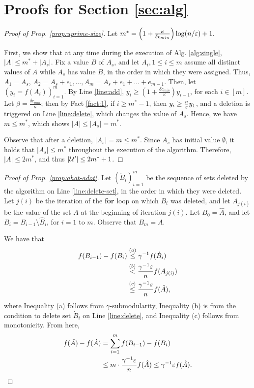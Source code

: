 \onecolumn

\appendix




\section{Proofs for Section \ref{sec:alg}} \label{apx:proof}
\begin{proof}[Proof of Prop. \ref{prop:uprime-size}]
  Let $m^* = \left( 1 + \frac{\kappa }{\delta c_{min} } \right) \log ( n / \varepsilon ) + 1.$
  
  First, we show that at any time during the execution of Alg. \ref{alg:single}, $|A| \le m^* + |A_s|$.
  Fix a value $B$ of $A_s$, and let $A_i, 1 \le i \le m$ assume all distinct values of $A$ while $A_s$
  has value $B$, in the order in which they were assigned. Thus, $A_1 = A_s$, $A_2 = A_s + e_1, \ldots, A_m = A_s + e_1 + \ldots + e_{m-1}$.
  Then, let $(y_i = f(A_i))_{i=1}^m$. By Line \ref{line:add}, $y_i \ge \left( 1 + \frac{\delta c_{min}}{\kappa } \right) y_{i-1}$, for each $i \in [m]$. Let $\beta = \frac{\delta c_{min}}{\kappa }$; then by Fact \ref{fact:1}, if $i \ge m^* - 1$, then $y_i \ge \frac{n}{\varepsilon} y_1$, and a deletion is triggered on Line \ref{line:delete}, which changes the value of $A_s$. Hence, we have $m \le m^*$, which shows $|A| \le |A_s| = m^*$.

  Observe that after a deletion, $|A_s| = m \le m^*$. Since $A_s$ has initial value $\emptyset$, it holds that $|A_s| \le m^*$ throughout the execution of the algorithm. Therefore, $|A| \le 2m^*$, and thus $|\mathcal{U}'| \le 2m^* +1$. 
\end{proof}
\begin{proof}[Proof of Prop. \ref{prop:ahat-adot}]
  Let $( \dot B_i )_{i=1}^m$ be the sequence of sets deleted by the algorithm on
  Line \ref{line:delete-set}, in the order in which they were deleted.
  Let $j(i)$ be the iteration of the \textbf{for} loop on which $B_i$
  was deleted, and let $A_{j(i)}$ be the value of the set $A$ at the
  beginning of iteration $j(i)$. Let $B_0 = \hat A$, and let
  $B_i = B_{i-1} \setminus \hat B_i$, for $i = 1$ to $m$.
  Observe that $B_m = \dot A$.

  We have that
  \begin{align*}
    f( B_{i-1} ) - f(B_i) &\overset{(a)}{\le} \gamma^{-1} f( \dot B_i ) \\
                          &\overset{(b)}{<} \frac{\gamma^{-1}\varepsilon}{n} f( A_{j(i)} ) \\
                          &\overset{(c)}{\le} \frac{\gamma^{-1}\varepsilon}{n} f( \hat A ),
  \end{align*}
  where Inequality (a) follows from $\gamma$-submodularity,
  Inequality (b) is from the condition to delete set $\dot B_i$ on Line \ref{line:delete},
  and Inequality (c) follows from monotonicity.
  From here,
  \begin{align*}
    f( \hat A ) - f( \dot A ) &= \sum_{i=1}^m f( B_{i-1} ) - f( B_i ) \\
    &\le m \cdot \frac{\gamma^{-1}\varepsilon}{n} f( \hat A ) \le \gamma^{-1}\varepsilon f( \hat A ). \qedhere
  \end{align*}
\end{proof}
